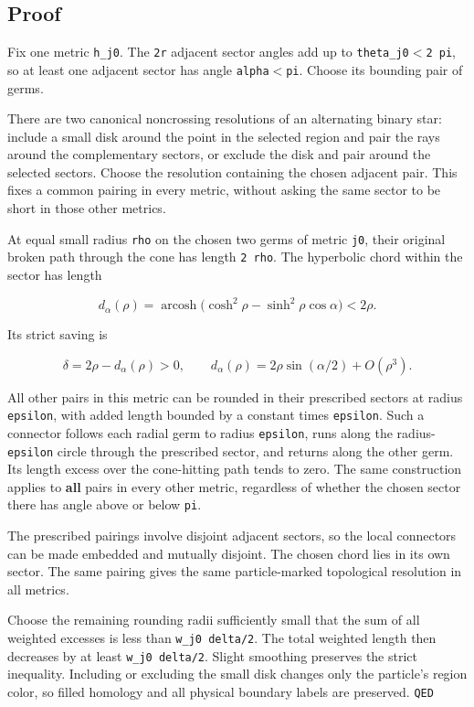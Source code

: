 \documentclass[11pt]{article}
\renewcommand{\textless}{\ensuremath{<}}
\begin{document}
\subsection{Proof}\label{proof-1}

Fix one metric \texttt{h\_\allowbreak j0}. The \texttt{2r} adjacent sector angles
add up to \texttt{theta\_\allowbreak j0\textless{}2\ pi}, so at least one adjacent
sector has angle \texttt{alpha\textless{}pi}. Choose its bounding pair
of germs.

There are two canonical noncrossing resolutions of an alternating binary
star: include a small disk around the point in the selected region and
pair the rays around the complementary sectors, or exclude the disk and
pair around the selected sectors. Choose the resolution containing the
chosen adjacent pair. This fixes a common pairing in every metric,
without asking the same sector to be short in those other metrics.

At equal small radius \texttt{rho} on the chosen two germs of metric
\texttt{j0}, their original broken path through the cone has length
\texttt{2\ rho}. The hyperbolic chord within the sector has length

\[
d_\alpha(\rho)=\operatorname{arcosh}
\big(\cosh^2\rho-\sinh^2\rho\cos\alpha\big)
<2\rho.
\]

Its strict saving is

\[
\delta=2\rho-d_\alpha(\rho)>0,
\qquad
d_\alpha(\rho)=2\rho\sin(\alpha/2)+O(\rho^3).
\]

All other pairs in this metric can be rounded in their prescribed
sectors at radius \texttt{epsilon}, with added length bounded by a
constant times \texttt{epsilon}. Such a connector follows each radial
germ to radius \texttt{epsilon}, runs along the radius-\texttt{epsilon}
circle through the prescribed sector, and returns along the other germ.
Its length excess over the cone-hitting path tends to zero. The same
construction applies to \textbf{all} pairs in every other metric,
regardless of whether the chosen sector there has angle above or below
\texttt{pi}.

The prescribed pairings involve disjoint adjacent sectors, so the local
connectors can be made embedded and mutually disjoint. The chosen chord
lies in its own sector. The same pairing gives the same particle-marked
topological resolution in all metrics.

Choose the remaining rounding radii sufficiently small that the sum of
all weighted excesses is less than \texttt{w\_\allowbreak j0\ delta/2}. The total
weighted length then decreases by at least \texttt{w\_\allowbreak j0\ delta/2}.
Slight smoothing preserves the strict inequality. Including or excluding
the small disk changes only the particle's region color, so filled
homology and all physical boundary labels are preserved. \texttt{QED}
\end{document}
